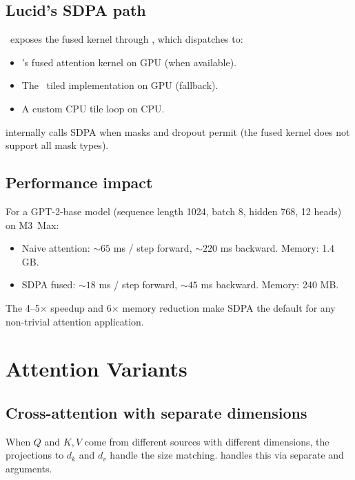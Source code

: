 \subsection{Lucid's SDPA path}
\label{ssec:attention:sdpa_path}

\Lucid\ exposes the fused kernel through
, which
dispatches to:

\begin{itemize}
  \item \MPSGraph's fused attention kernel on GPU (when
    available).
  \item The \MLX\ tiled implementation on GPU (fallback).
  \item A custom CPU tile loop on CPU.
\end{itemize}

 internally calls SDPA when masks and
dropout permit (the fused kernel does not support all mask types).

\subsection{Performance impact}
\label{ssec:attention:perf_impact}

For a GPT-2-base model (sequence length 1024, batch 8, hidden
768, 12 heads) on M3~Max:

\begin{itemize}
  \item Naive attention: $\sim 65$ ms / step forward,
    $\sim 220$ ms backward. Memory: 1.4 GB.
  \item SDPA fused: $\sim 18$ ms / step forward,
    $\sim 45$ ms backward. Memory: 240 MB.
\end{itemize}

The 4--5$\times$ speedup and 6$\times$ memory reduction make SDPA
the default for any non-trivial attention application.

\section{Attention Variants}
\label{sec:attention:variants}

\subsection{Cross-attention with separate dimensions}
\label{ssec:attention:cross_dim}

When $Q$ and $K, V$ come from different sources with different
dimensions, the projections to $d_k$ and $d_v$ handle the size
matching.  handles this via separate
 and  arguments.

